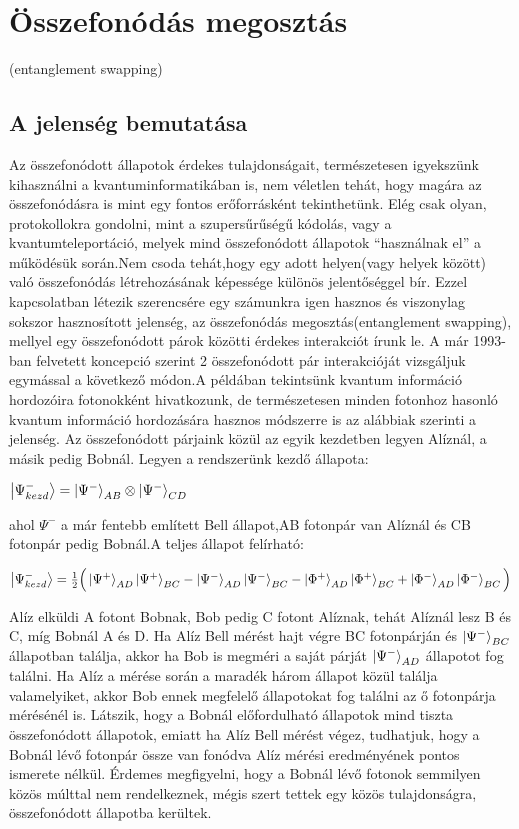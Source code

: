 \section{Összefonódás megosztás}
(entanglement swapping)
\subsection{A jelenség bemutatása}
Az összefonódott állapotok érdekes tulajdonságait, természetesen igyekszünk kihasználni a kvantuminformatikában is, nem véletlen tehát, hogy magára az összefonódásra is mint egy fontos erőforrásként tekinthetünk. Elég csak olyan, protokollokra gondolni, mint a szupersűrűségű kódolás, vagy a kvantumteleportáció, melyek mind összefonódott állapotok “használnak el” a működésük során.Nem csoda tehát,hogy egy adott helyen(vagy helyek között) való összefonódás létrehozásának képessége különös jelentőséggel bír. Ezzel kapcsolatban létezik szerencsére egy számunkra igen hasznos és viszonylag sokszor hasznosított jelenség, az összefonódás megosztás(entanglement swapping), mellyel egy összefonódott párok közötti érdekes interakciót írunk le. A már 1993-ban felvetett koncepció szerint\cite{zukowski1993event} 2 összefonódott pár interakcióját vizsgáljuk egymással a következő módon.A példában tekintsünk kvantum információ hordozóira fotonokként hivatkozunk, de természetesen minden fotonhoz hasonló kvantum információ hordozására hasznos módszerre is az alábbiak szerinti a jelenség. Az összefonódott párjaink közül az egyik kezdetben legyen Alíznál, a másik pedig Bobnál. Legyen a rendszerünk kezdő állapota:
\begin{center}
$ \ket{\Psi_{kezd}^-}= \ket{\Psi^-}_{AB} \otimes \ket{\Psi^-}_{CD} $
\end{center}
ahol $ \Psi^- $ a már fentebb említett Bell állapot,AB fotonpár van Alíznál és CB fotonpár pedig Bobnál.A teljes állapot felírható:
\begin{center}
$ \ket{\Psi_{kezd}^-} = \frac{1}{2} \Big( \ket{\Psi^+}_{AD}\ket{\Psi^+}_{BC}-\ket{\Psi^-}_{AD}\ket{\Psi^-}_{BC} - \ket{\Phi^+}_{AD}\ket{\Phi^+}_{BC}+\ket{\Phi^-}_{AD}\ket{\Phi^-}_{BC} \Big) $
\end{center}
Alíz elküldi A fotont Bobnak, Bob pedig C fotont Alíznak, tehát Alíznál lesz B és C, míg Bobnál A és D. Ha Alíz Bell mérést hajt végre BC fotonpárján és $ \ket{\Psi^-}_{BC} $  állapotban találja, akkor ha Bob is megméri a saját párját $ \ket{\Psi^-}_{AD} $ állapotot fog találni. Ha Alíz a mérése során a maradék három állapot közül találja valamelyiket, akkor Bob ennek megfelelő állapotokat fog találni az ő fotonpárja mérésénél is. Látszik, hogy a Bobnál előfordulható állapotok mind tiszta összefonódott állapotok, emiatt ha Alíz Bell mérést végez, tudhatjuk, hogy a Bobnál lévő fotonpár össze van fonódva Alíz mérési eredményének pontos ismerete nélkül. Érdemes megfigyelni, hogy a Bobnál lévő fotonok semmilyen közös múlttal nem rendelkeznek, mégis szert tettek egy közös tulajdonságra, összefonódott állapotba kerültek.
